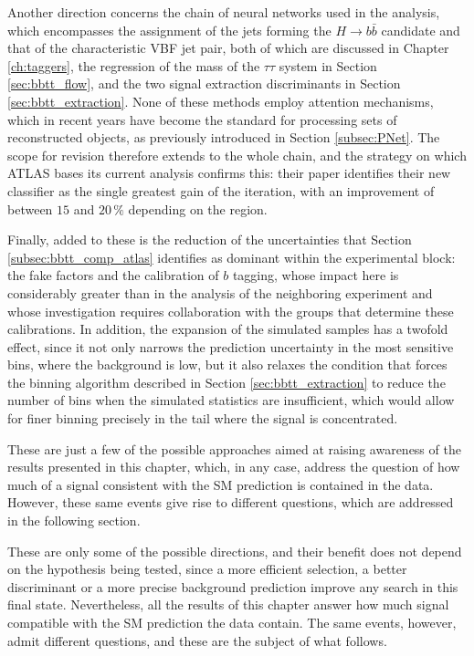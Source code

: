 
Another direction concerns the chain of neural networks used in the analysis, which encompasses the assignment of the jets forming the $H\to b\bar{b}$ candidate and that of the characteristic VBF jet pair, both of which are discussed in Chapter \ref{ch:taggers}, the regression of the mass of the $\tau\tau$ system in Section \ref{sec:bbtt_flow}, and the two signal extraction discriminants in Section \ref{sec:bbtt_extraction}. None of these methods employ attention mechanisms, which in recent years have become the standard for processing sets of reconstructed objects, as previously introduced in Section \ref{subsec:PNet}. The scope for revision therefore extends to the whole chain, and the strategy on which ATLAS bases its current analysis confirms this: their paper identifies their new classifier as the single greatest gain of the iteration, with an improvement of between $15$ and $20\,\%$ depending on the region.

Finally, added to these is the reduction of the uncertainties that Section \ref{subsec:bbtt_comp_atlas} identifies as dominant within the experimental block: the fake factors and the calibration of $b$ tagging, whose impact here is considerably greater than in the analysis of the neighboring experiment and whose investigation requires collaboration with the groups that determine these calibrations. In addition, the expansion of the simulated samples has a twofold effect, since it not only narrows the prediction uncertainty in the most sensitive bins, where the background is low, but it also relaxes the condition that forces the binning algorithm described in Section \ref{sec:bbtt_extraction} to reduce the number of bins when the simulated statistics are insufficient, which would allow for finer binning precisely in the tail where the signal is concentrated.\medskip

These are just a few of the possible approaches aimed at raising awareness of the results presented in this chapter, which, in any case, address the question of how much of a signal consistent with the SM prediction is contained in the data. However, these same events give rise to different questions, which are addressed in the following section.

These are only some of the possible directions, and their benefit does not depend on the hypothesis being tested, since a more efficient selection, a better discriminant or a more precise background prediction improve any search in this final state. Nevertheless, all the results of this chapter answer how much signal compatible with the SM prediction the data contain. The same events, however, admit different questions, and these are the subject of what follows.


